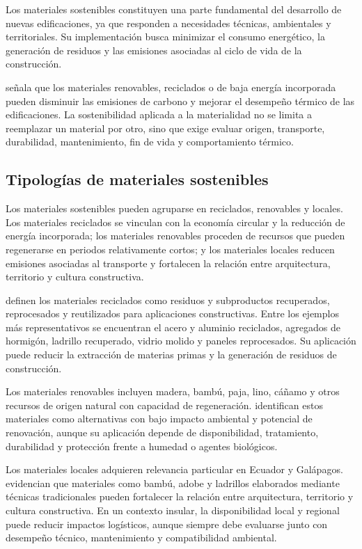 \begin{textoDosTercios}

Los materiales sostenibles constituyen una parte fundamental del desarrollo de nuevas edificaciones, ya que responden a necesidades técnicas, ambientales y territoriales. Su implementación busca minimizar el consumo energético, la generación de residuos y las emisiones asociadas al ciclo de vida de la construcción.

\textcite{aberaSustainableBuildingMaterials2024} señala que los materiales renovables, reciclados o de baja energía incorporada pueden disminuir las emisiones de carbono y mejorar el desempeño térmico de las edificaciones. La sostenibilidad aplicada a la materialidad no se limita a reemplazar un material por otro, sino que exige evaluar origen, transporte, durabilidad, mantenimiento, fin de vida y comportamiento térmico.

\subsection{Tipologías de materiales sostenibles}

Los materiales sostenibles pueden agruparse en reciclados, renovables y locales. Los materiales reciclados se vinculan con la economía circular y la reducción de energía incorporada; los materiales renovables proceden de recursos que pueden regenerarse en periodos relativamente cortos; y los materiales locales reducen emisiones asociadas al transporte y fortalecen la relación entre arquitectura, territorio y cultura constructiva.


\textcite{wuRecycledMaterialsConstruction2025} definen los materiales reciclados como residuos y subproductos recuperados, reprocesados y reutilizados para aplicaciones constructivas. Entre los ejemplos más representativos se encuentran el acero y aluminio reciclados, agregados de hormigón, ladrillo recuperado, vidrio molido y paneles reprocesados. Su aplicación puede reducir la extracción de materias primas y la generación de residuos de construcción.

Los materiales renovables incluyen madera, bambú, paja, lino, cáñamo y otros recursos de origen natural con capacidad de regeneración. \textcite{zajemskaReviewCurrentTrends2025} identifican estos materiales como alternativas con bajo impacto ambiental y potencial de renovación, aunque su aplicación depende de disponibilidad, tratamiento, durabilidad y protección frente a humedad o agentes biológicos.

Los materiales locales adquieren relevancia particular en Ecuador y Galápagos. \textcite{martinesAssessingSustainabilityLocal2025} evidencian que materiales como bambú, adobe y ladrillos elaborados mediante técnicas tradicionales pueden fortalecer la relación entre arquitectura, territorio y cultura constructiva. En un contexto insular, la disponibilidad local y regional puede reducir impactos logísticos, aunque siempre debe evaluarse junto con desempeño técnico, mantenimiento y compatibilidad ambiental.

\end{textoDosTercios}


